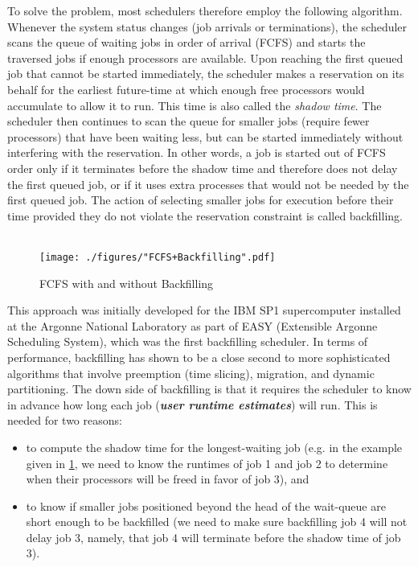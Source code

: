 To solve the problem, most schedulers therefore employ the following algorithm. Whenever the system status changes (job arrivals or terminations), the scheduler scans the queue of waiting jobs in order of arrival (FCFS) and starts the traversed jobs if enough processors are available. Upon reaching the first queued job that cannot be started immediately, the scheduler makes a reservation on its behalf for the earliest future-time at which enough free processors would accumulate to allow it to run. This time is also called the \textit{shadow time}. The scheduler then continues to scan the queue for smaller jobs (require fewer processors) that have been waiting less, but can be started immediately without interfering with the reservation. In other words, a job is started out of FCFS order only if it terminates before the shadow time and therefore does not delay the first queued job, or if it uses extra processes that would not be needed by the first queued job. The action of selecting smaller jobs for execution before their time provided they do not violate the reservation constraint is called backfilling.\\ \\
\begin{figure}[!htbp]
\centering
\texttt{[image: ./figures/"FCFS+Backfilling".pdf]}
\caption{FCFS with and without Backfilling\cite{tsafrir}}
\label{fig:32}
\end{figure}
This approach was initially developed for the IBM SP1 supercomputer installed at the Argonne National Laboratory as part of EASY (Extensible Argonne Scheduling System), which was the first backfilling scheduler\cite{lifka}. In terms of performance, backfilling has shown to be a close second to more sophisticated algorithms that involve preemption (time slicing), migration, and dynamic partitioning. The down side of backfilling is that it requires the scheduler to know in advance how long each job (\textbf{\textit{user runtime estimates}}) will run. This is needed for two reasons:
\begin{itemize}
\item to compute the shadow time for the longest-waiting job (e.g. in the example given in \ref{fig:32}, we need to know the runtimes of job 1 and job 2 to determine when their processors will be freed in favor of job 3), and
\item to know if smaller jobs positioned beyond the head of the wait-queue are short enough to be backfilled (we need to make sure backfilling job 4 will not delay job 3, namely, that job 4 will terminate before the shadow time of job 3).
\end{itemize}
